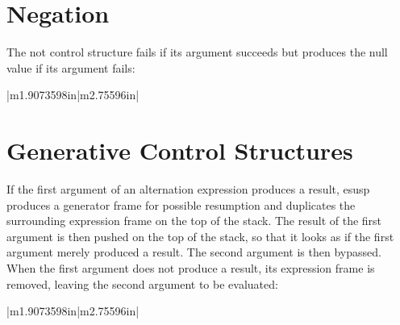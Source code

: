 \section{Negation}

The not control structure fails if its argument succeeds but produces
the null value if its argument fails:

\begin{center}
\tablelasttail{\hline}
\begin{xtabular}{|m{1.9073598in}|m{2.75596in}|}

\end{xtabular}
\end{center}


\section{Generative Control Structures}

If the first argument of an alternation expression produces a result,
esusp produces a generator frame for possible resumption and
duplicates the surrounding expression frame on the top of the
stack. The result of the first argument is then pushed on the top of
the stack, so that it looks as if the first argument merely produced a
result. The second argument is then bypassed. When the first argument
does not produce a result, its expression frame is removed, leaving
the second argument to be evaluated:

\begin{center}
\tablelasttail{\hline}
\begin{xtabular}{|m{1.9073598in}|m{2.75596in}|}

\end{xtabular}
\end{center}

